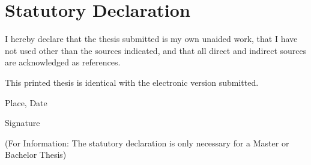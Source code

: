 \section*{Statutory Declaration}
\label{sec:statutory_delcaration}
I hereby declare that the thesis submitted is my own unaided work, that I have not used other than the sources indicated, and that all direct and indirect sources are acknowledged as references.

This printed thesis is identical with the electronic version submitted.

Place, Date

Signature

(For Information: The statutory declaration is only necessary for a Master or Bachelor Thesis)